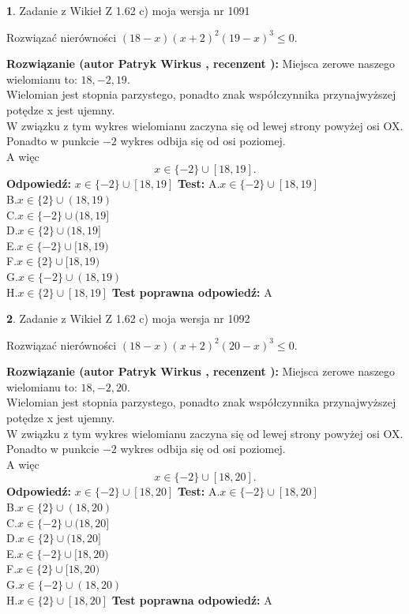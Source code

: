 \documentclass[12pt, a4paper]{article}
\theoremstyle{definition} %
\newtheorem{zad}{}
\newcommand{\zadStart}[1]{\begin{zad}#1\newline}
\newcommand{\zadStop}{\end{zad}}
\newcommand{\rozwStart}[2]{\noindent \textbf{Rozwiązanie (autor #1 , recenzent #2): }\newline}
\newcommand{\rozwStop}{\newline}
\newcommand{\odpStart}{\noindent \textbf{Odpowiedź:}\newline}
\newcommand{\odpStop}{\newline}
\newcommand{\testStart}{\noindent \textbf{Test:}\newline}
\newcommand{\testStop}{\newline}
\newcommand{\kluczStart}{\noindent \textbf{Test poprawna odpowiedź:}\newline}
\newcommand{\kluczStop}{\newline}
\begin{document}
\zadStart{Zadanie z Wikieł Z 1.62 c) moja wersja nr 1091}

Rozwiązać nierówności $(18-x)(x+2)^{2}(19-x)^{3}\le0$.
\zadStop
\rozwStart{Patryk Wirkus}{}
Miejsca zerowe naszego wielomianu to: $18, -2, 19$.\\
Wielomian jest stopnia parzystego, ponadto znak współczynnika przy\linebreak najwyższej potędze x jest ujemny.\\ W związku z tym wykres wielomianu zaczyna się od lewej strony powyżej osi OX.\\
Ponadto w punkcie $-2$ wykres odbija się od osi poziomej.\\
A więc $$x \in \{-2\} \cup [18,19].$$
\rozwStop
\odpStart
$x \in \{-2\} \cup [18,19]$
\odpStop
\testStart
A.$x \in \{-2\} \cup [18,19]$\\
B.$x \in \{2\} \cup (18,19)$\\
C.$x \in \{-2\} \cup (18,19]$\\
D.$x \in \{2\} \cup (18,19]$\\
E.$x \in \{-2\} \cup [18,19)$\\
F.$x \in \{2\} \cup [18,19)$\\
G.$x \in \{-2\} \cup (18,19)$\\
H.$x \in \{2\} \cup [18,19]$
\testStop
\kluczStart
A
\kluczStop



\zadStart{Zadanie z Wikieł Z 1.62 c) moja wersja nr 1092}

Rozwiązać nierówności $(18-x)(x+2)^{2}(20-x)^{3}\le0$.
\zadStop
\rozwStart{Patryk Wirkus}{}
Miejsca zerowe naszego wielomianu to: $18, -2, 20$.\\
Wielomian jest stopnia parzystego, ponadto znak współczynnika przy\linebreak najwyższej potędze x jest ujemny.\\ W związku z tym wykres wielomianu zaczyna się od lewej strony powyżej osi OX.\\
Ponadto w punkcie $-2$ wykres odbija się od osi poziomej.\\
A więc $$x \in \{-2\} \cup [18,20].$$
\rozwStop
\odpStart
$x \in \{-2\} \cup [18,20]$
\odpStop
\testStart
A.$x \in \{-2\} \cup [18,20]$\\
B.$x \in \{2\} \cup (18,20)$\\
C.$x \in \{-2\} \cup (18,20]$\\
D.$x \in \{2\} \cup (18,20]$\\
E.$x \in \{-2\} \cup [18,20)$\\
F.$x \in \{2\} \cup [18,20)$\\
G.$x \in \{-2\} \cup (18,20)$\\
H.$x \in \{2\} \cup [18,20]$
\testStop
\kluczStart
A
\kluczStop
\end{document}
